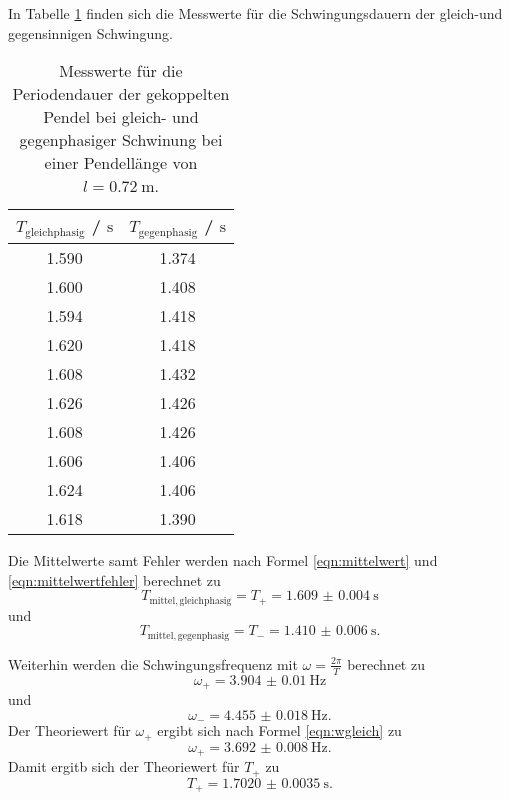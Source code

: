 In Tabelle \ref{tab:beckham} finden sich die Messwerte für die Schwingungsdauern der gleich-und gegensinnigen Schwingung.
\begin{table}
	\centering
	\caption{Messwerte für die Periodendauer der gekoppelten Pendel bei gleich- und
		gegenphasiger Schwinung bei einer Pendellänge von $l=\SI{0.72}{\meter}$.}
	\label{tab:beckham}
	\begin{tabular}{cc}
		\toprule
		$T_{\mathrm{gleichphasig}}$ / $\si{\second}$ & $T_{\mathrm{gegenphasig}}$
		/ $\si{\second}$ \\
		\midrule
		1.590                                        & 1.374                      \\
		1.600                                        & 1.408                      \\
		1.594                                        & 1.418                      \\
		1.620                                        & 1.418                      \\
		1.608                                        & 1.432                      \\
		1.626                                        & 1.426                      \\
		1.608                                        & 1.426                      \\
		1.606                                        & 1.406                      \\
		1.624                                        & 1.406                      \\
		1.618                                        & 1.390                      \\
		\bottomrule
	\end{tabular}
\end{table}

Die Mittelwerte samt Fehler werden nach Formel \eqref{eqn:mittelwert} und \eqref{eqn:mittelwertfehler} berechnet zu
\begin{equation*}
	T_{\mathrm{mittel,gleichphasig}} = T_+ = \SI{1.609(4)}{\second}
\end{equation*}
und
\begin{equation*}
	T_{\mathrm{mittel,gegenphasig}} = T_- = \SI{1.410(6)}{\second} \mathrm{.}
\end{equation*}

Weiterhin werden die Schwingungsfrequenz mit $\omega = \frac{2\pi}{T}$ berechnet zu
\begin{equation*}
	\omega_+ = \SI{3.904(10)}{\hertz}
\end{equation*}
und
\begin{equation*}
	\omega_- = \SI{4.455(18)}{\hertz} \mathrm{.}
\end{equation*}
Der Theoriewert für $\omega_+$ ergibt sich nach Formel \eqref{eqn:wgleich} zu
\begin{equation*}
	\omega_+ = \SI{3.692(8)}{\hertz} \mathrm{.}
\end{equation*}
Damit ergitb sich der Theoriewert für $T_{\mathrm{+}}$ zu
\begin{equation*}
	T_+ = \SI{1.7020(35)}{\second} \mathrm{.}
\end{equation*}

